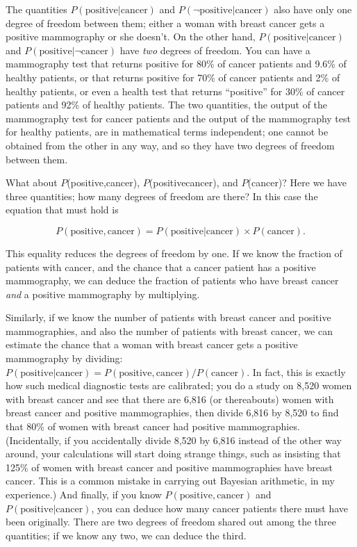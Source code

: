 { The quantities $P(\text{positive}|\text{cancer})$ and
$P(\lnot\text{positive}|\text{cancer})$ also have only one degree of
freedom between them; either a woman with breast cancer gets a positive
mammography or she doesn't. On the other hand,
$P(\text{positive}|\text{cancer})$ and $P(\text{positive}|\lnot\text{cancer})$
have \textit{two} degrees of freedom. You can have a mammography test
that returns positive for 80\% of cancer patients and 9.6\% of healthy
patients, or that returns positive for 70\% of cancer patients and 2\%
of healthy patients, or even a health test that returns
``positive'' for 30\% of cancer
patients and 92\% of healthy patients. The two quantities, the output
of the mammography test for cancer patients and the output of the
mammography test for healthy patients, are in mathematical terms
independent; one cannot be obtained from the other in any way, and so
they have two degrees of freedom between them.


 What about $P$(positive,cancer), $P$(positive\textbar cancer), and
$P$(cancer)? Here we have three quantities; how many degrees of freedom
are there? In this case the equation that must hold is

\begin{equation*}
 P(\text{positive}, \text{cancer}) = P(\text{positive}|\text{cancer}) \times
P(\text{cancer}).
\end{equation*}


 This equality reduces the degrees of freedom by one. If we know
the fraction of patients with cancer, and the chance that a cancer
patient has a positive mammography, we can deduce the fraction of
patients who have breast cancer \textit{and} a positive mammography by
multiplying.


 Similarly, if we know the number of patients with breast cancer
and positive mammographies, and also the number of patients with breast
cancer, we can estimate the chance that a woman with breast cancer gets
a positive mammography by dividing: $P(\text{positive}|\text{cancer}) =
P(\text{positive}, \text{cancer})/P(\text{cancer})$. In fact, this is exactly how such
medical diagnostic tests are calibrated; you do a study on 8,520 women
with breast cancer and see that there are 6,816 (or thereabouts) women
with breast cancer and positive mammographies, then divide 6,816 by
8,520 to find that 80\% of women with breast cancer had positive
mammographies. (Incidentally, if you accidentally divide 8,520 by 6,816
instead of the other way around, your calculations will start doing
strange things, such as insisting that 125\% of women with breast
cancer and positive mammographies have breast cancer. This is a common
mistake in carrying out Bayesian arithmetic, in my experience.) And
finally, if you know $P(\text{positive}, \text{cancer})$ and
$P(\text{positive}|\text{cancer})$, you can deduce how many cancer patients
there must have been originally. There are two degrees of freedom
shared out among the three quantities; if we know any two, we can
deduce the third.


}
